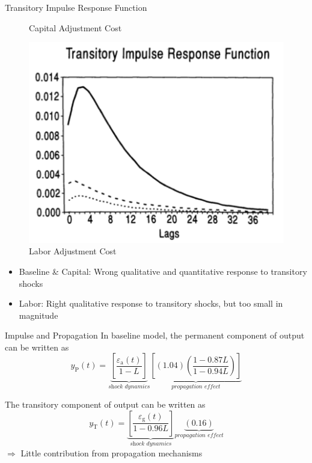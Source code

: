 \documentclass[10pt]{beamer}
\begin{document}
\begin{frame}{Transitory Impulse Response Function}
\begin{minipage}{0.33\textwidth}
\begin{figure}
            \caption{Capital Adjustment Cost}
        \end{figure}
    \end{minipage}%
    \begin{minipage}{0.33\textwidth}
        \begin{figure}
            \centering
            \includegraphics[width=\linewidth]{figures/L_trans_IRF.png}
            \caption{Labor Adjustment Cost}
        \end{figure}
    \end{minipage}
    \begin{itemize}
        \item Baseline \& Capital: Wrong qualitative and quantitative response to transitory
              shocks
        \item Labor: Right qualitative response to transitory shocks, but too small in
              magnitude
    \end{itemize}

\end{frame}

\begin{frame}{Impulse and Propagation}
    In baseline model, the permanent component of output can be written as 
    $$
    y_{\mathrm{P}}(t)=\underbrace{\left[\frac{\varepsilon_{\mathrm{a}}(t)}{1-L}\right]}_{\textit{shock dynamics}}\underbrace{\left[(1.04)\left(\frac{1-0.87 L}{1-0.94 L}\right)\right]}_{\textit{propagation effect}}
    $$

    The transitory component of output can be written as
    $$
    y_{\mathrm{T}}(t)=\underbrace{\left[\frac{\varepsilon_{\mathrm{g}}(t)}{1-0.96 L}\right]}_{\textit{shock dynamics}}\underbrace{(0.16)}_{\textit{propagation effect}}
    $$
$\Rightarrow$ Little contribution from propagation mechanisms

\end{frame}
\end{document}
